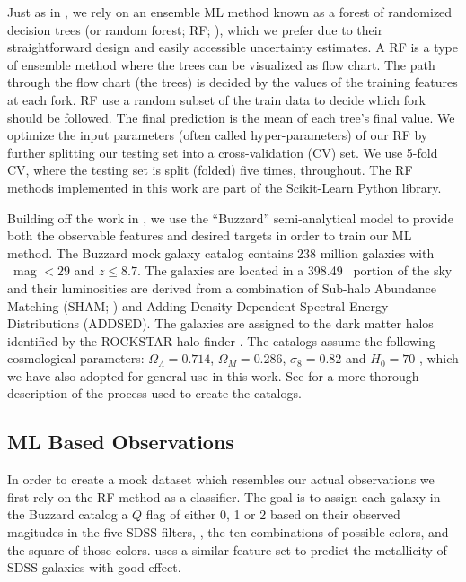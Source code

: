 Just as in , we rely on an ensemble ML method  known as a forest of randomized decision trees (or random forest; RF; \citealt{Ho1995, Ho1998}), which we prefer due to their straightforward design and easily accessible uncertainty estimates. A RF is a type of ensemble method where the trees can be visualized as flow chart. The path through the flow chart (the trees) is decided by the values of the training features at each fork. RF use a random subset of the train data to decide which fork should be followed. The final prediction is the mean of each tree's final value. We optimize the input parameters (often called hyper-parameters) of our RF by further splitting our testing set into a cross-validation (CV) set. We use 5-fold CV, where the testing set is split (folded) five times, throughout. The RF methods implemented in this work are part of the {\sc Scikit-Learn} \citep{Pedregosa2012} Python library.

Building off the work in , we use the ``Buzzard'' semi-analytical model to provide both the observable features and desired targets in order to train our ML method. The Buzzard mock galaxy catalog contains 238 million galaxies with \sdssr\ mag $< 29$ and $z \leq 8.7$. The galaxies are located in a 398.49 \degsq\ portion of the sky and their luminosities are derived from a combination of Sub-halo Abundance Matching (SHAM; \citealt{Reddick2013}) and Adding Density Dependent Spectral Energy Distributions (ADDSED). The galaxies are assigned to the dark matter halos identified by the {\sc ROCKSTAR} halo finder \citep{Behroozi2013}. The catalogs assume the following cosmological parameters: $\Omega_\Lambda = 0.714$, $\Omega_M = 0.286$, $\sigma_8 = 0.82$ and $H_0= 70$ \kms \mpc, which we have also adopted for general use in this work. See  for a more thorough description of the process used to create the catalogs.

\subsection{ML Based Observations}

In order to create a mock dataset which resembles our actual observations we first rely on the RF method as a classifier. The goal is to assign each galaxy in the Buzzard catalog a $Q$ flag of either 0, 1 or 2 based on their observed magitudes in the five SDSS filters, \sdssu\sdssg\sdssr\sdssi\sdssz, the ten combinations of possible colors, and the square of those colors. \cite{Acquaviva2016} uses a similar feature set to predict the metallicity of SDSS galaxies with good effect. 

